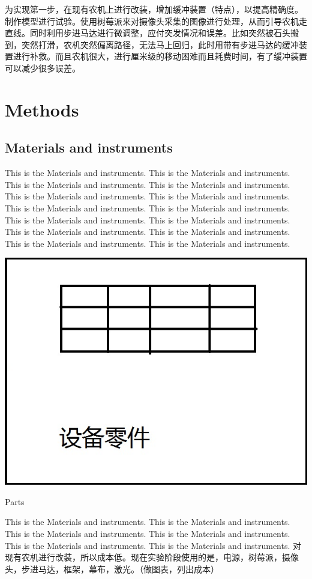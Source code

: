 \documentclass[12pt]{article}
\begin{document}
\begin{flushleft}
为实现第一步，在现有农机上进行改装，增加缓冲装置（特点），以提高精确度。制作模型进行试验。使用树莓派来对摄像头采集的图像进行处理，从而引导农机走直线。同时利用步进马达进行微调整，应付突发情况和误差。比如突然被石头搬到，突然打滑，农机突然偏离路径，无法马上回归，此时用带有步进马达的缓冲装置进行补救。而且农机很大，进行厘米级的移动困难而且耗费时间，有了缓冲装置可以减少很多误差。

\section{Methods}

\subsection{Materials and instruments}
This is the Materials and instruments. This is the Materials and instruments. This is the Materials and instruments. This is the Materials and instruments. This is the Materials and instruments. This is the Materials and instruments. This is the Materials and instruments. This is the Materials and instruments. This is the Materials and instruments. This is the Materials and instruments. This is the Materials and instruments. This is the Materials and instruments. This is the Materials and instruments. This is the Materials and instruments. 
\begin{table}[h!]
	\begin{center}
		\includegraphics[scale = 0.6]{parts.jpg}
		\caption{Parts}
	\end{center}
\end{table}
This is the Materials and instruments. This is the Materials and instruments. This is the Materials and instruments. This is the Materials and instruments. This is the Materials and instruments. This is the Materials and instruments. 
对现有农机进行改装，所以成本低。现在实验阶段使用的是，电源，树莓派，摄像头，步进马达，框架，幕布，激光。（做图表，列出成本）


\end{flushleft}
\end{document}

